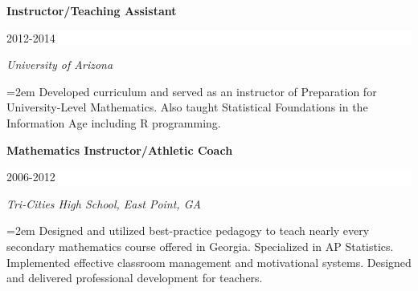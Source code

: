 \documentclass[paper=a4,fontsize=11pt]{scrartcl} %
\newcommand{\sepspace}{\vspace*{1em}}		%
\newcommand{\EducationEntry}[4]{
		\noindent \textbf{#1} \hfill      %
		\colorbox{White}{%
			\parbox{6em}{%
			\hfill\color{Black}#2}} \par  %
		\noindent \textit{#3} \par        %
		\noindent\hangindent=2em\hangafter=0 \small #4 %
		\normalsize \par \vspace{-7pt}}
\begin{document}
\EducationEntry{Instructor/Teaching Assistant}{2012-2014}{University of Arizona}
{Developed curriculum and served as an instructor of Preparation for University-Level Mathematics. Also taught Statistical Foundations in the Information Age including \textsc{R} programming.}
\sepspace

\EducationEntry{Mathematics Instructor/Athletic Coach}{2006-2012}{Tri-Cities High School, East Point, GA}
{Designed and utilized best-practice pedagogy to teach nearly every secondary mathematics course offered in Georgia.  Specialized in AP Statistics. Implemented effective classroom management and motivational systems. Designed and delivered professional development for teachers.}

\end{document}
